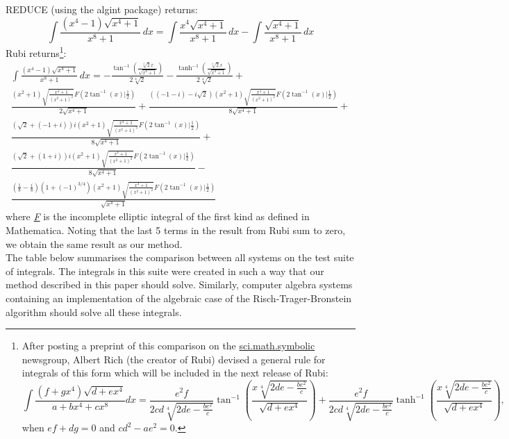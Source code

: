 \documentclass[12pt]{article}
\numberwithin{equation}{section}
\theoremstyle{definition}
\begin{document}
\noindent REDUCE (using the algint package) returns:
\small
$$\int \frac{\left(x^4-1\right) \sqrt{x^4+1}}{x^8+1} \, dx = 
\int \frac{x^4 \sqrt{x^4+1}}{x^8+1} \, dx-\int \frac{\sqrt{x^4+1}}{x^8+1} \, dx$$
\normalsize
Rubi returns\footnote{After posting a preprint of this comparison on the 
\href{https://groups.google.com/forum/\#!forum/sci.math.symbolic}{sci.math.symbolic}
newsgroup, Albert Rich (the creator of Rubi) devised a general rule for integrals of this 
form which will be included in the next release of Rubi: %
$$\int\frac{\left(f+g x^4\right)\sqrt{d+e x^4}}{a+b x^4+c x^8} dx = 
\frac{e^2 f}{2 c d \sqrt[4]{2 d e-\frac{b e^2}{c}}} \tan ^{-1}\left(\frac{x \sqrt[4]{2 d e-\frac{b e^2}{c}}}{\sqrt{d+e x^4}}\right) 
	+\frac{e^2 f}{2 c d \sqrt[4]{2 d e-\frac{b e^2}{c}}} \tanh ^{-1}\left(\frac{x \sqrt[4]{2 d e-\frac{be^2}{c}}}{\sqrt{d+e x^4}}\right),$$ when $e f+d g=0$ and $c d^2-a e^2=0$.}:
\small
\begin{multline*}
\int \frac{\left(x^4-1\right) \sqrt{x^4+1}}{x^8+1} \, dx=
-\frac{\tan ^{-1}\left(\frac{\sqrt[4]{2} x}{\sqrt{x^4+1}}\right)}{2 \sqrt[4]{2}}-
\frac{\tanh^{-1}\left(\frac{\sqrt[4]{2} x}{\sqrt{x^4+1}}\right)}{2 \sqrt[4]{2}} + \\
\frac{\left(x^2+1\right) \sqrt{\frac{x^4+1}{\left(x^2+1\right)^2}} F\left(2\tan ^{-1}(x)|\frac{1}{2}\right)}{2 \sqrt{x^4+1}} + 
\frac{\left((-1-i)-i \sqrt{2}\right) \left(x^2+1\right) \sqrt{\frac{x^4+1}{\left(x^2+1\right)^2}}
F\left(2 \tan ^{-1}(x)|\frac{1}{2}\right)}{8 \sqrt{x^4+1}} + \\
\frac{\left(\sqrt{2}+(-1+i)\right) i \left(x^2+1\right) \sqrt{\frac{x^4+1}{\left(x^2+1\right)^2}}
F\left(2 \tan ^{-1}(x)|\frac{1}{2}\right)}{8 \sqrt{x^4+1}} + \\
\frac{\left(\sqrt{2}+(1+i)\right) i \left(x^2+1\right) \sqrt{\frac{x^4+1}{\left(x^2+1\right)^2}}
F\left(2 \tan ^{-1}(x)|\frac{1}{2}\right)}{8 \sqrt{x^4+1}} - \\
\frac{\left(\frac{1}{8}-\frac{i}{8}\right) \left(1+(-1)^{3/4}\right) \left(x^2+1\right)
\sqrt{\frac{x^4+1}{\left(x^2+1\right)^2}} F\left(2 \tan ^{-1}(x)|\frac{1}{2}\right)}{\sqrt{x^4+1}}
\end{multline*}
\normalsize
where \href{https://reference.wolfram.com/language/ref/EllipticF.html}{\textit{F}} is the incomplete 
elliptic integral of the first kind as defined in Mathematica. Noting that the last 5 terms 
in the result from Rubi sum to zero, we obtain the same result as our method. \\

The table below summarises the comparison between all systems on the test suite of integrals. The integrals 
in this suite were created in such a way that our method described in this paper should solve. Similarly, 
computer algebra systems containing an implementation of the algebraic case of the Risch-Trager-Bronstein 
algorithm should solve all these integrals. 
\end{document}
